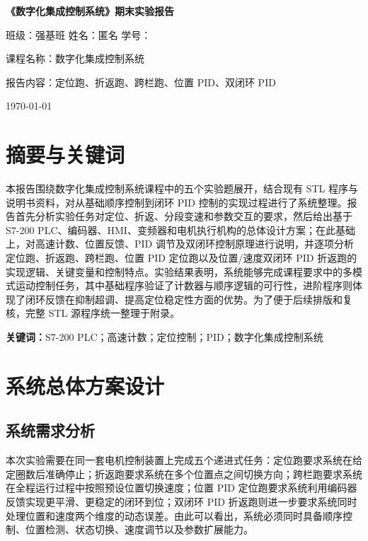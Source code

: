 \documentclass[12pt,a4paper]{ctexart}
\begin{document}
\begin{titlepage}
    \centering
    \vspace*{2.2cm}
    {\bfseries 《数字化集成控制系统》期末实验报告\par}
    \vspace{2.8cm}
    {班级：强基班 \quad 姓名：匿名 \quad 学号：\par}
    \vspace{1.1cm}
    {课程名称：数字化集成控制系统\par}
    \vspace{1.1cm}
    {报告内容：定位跑、折返跑、跨栏跑、位置 PID、双闭环 PID\par}
    \vfill
    {\today\par}
\end{titlepage}

\tableofcontents
\clearpage

\section*{摘要与关键词}

本报告围绕数字化集成控制系统课程中的五个实验题展开，结合现有 STL 程序与说明书资料，对从基础顺序控制到闭环 PID 控制的实现过程进行了系统整理。报告首先分析实验任务对定位、折返、分段变速和参数交互的要求，然后给出基于 S7-200 PLC、编码器、HMI、变频器和电机执行机构的总体设计方案；在此基础上，对高速计数、位置反馈、PID 调节及双闭环控制原理进行说明，并逐项分析定位跑、折返跑、跨栏跑、位置 PID 定位跑以及位置/速度双闭环 PID 折返跑的实现逻辑、关键变量和控制特点。实验结果表明，系统能够完成课程要求中的多模式运动控制任务，其中基础程序验证了计数器与顺序逻辑的可行性，进阶程序则体现了闭环反馈在抑制超调、提高定位稳定性方面的优势。为了便于后续排版和复核，完整 STL 源程序统一整理于附录。

\noindent\textbf{关键词：}S7-200 PLC；高速计数；定位控制；PID；数字化集成控制系统

\clearpage
\section{系统总体方案设计}

\subsection{系统需求分析}
本次实验需要在同一套电机控制装置上完成五个递进式任务：定位跑要求系统在给定圈数后准确停止；折返跑要求系统在多个位置点之间切换方向；跨栏跑要求系统在全程运行过程中按照预设位置切换速度；位置 PID 定位跑要求系统利用编码器反馈实现更平滑、更稳定的闭环到位；双闭环 PID 折返跑则进一步要求系统同时处理位置和速度两个维度的动态误差。由此可以看出，系统必须同时具备顺序控制、位置检测、状态切换、速度调节以及参数扩展能力。
\end{document}
